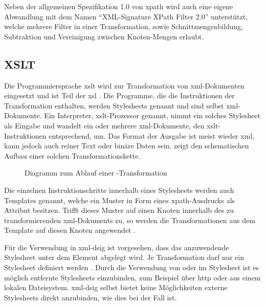 Neben der allgemeinen Spezifikation 1.0 von \gls{xpath} \cite{xpath:w3c} wird auch eine eigene Abwandlung mit dem Namen "`XML-Signature XPath Filter 2.0"'
\cite{xml-dsig-filter:w3c} unterstützt, welche mehrere Filter in einer Transformation, sowie Schnittmengenbildung, Subtraktion und Vereinigung zwischen
Knoten-Mengen erlaubt.

\subsection{XSLT}
\label{sec:XML-DSig:Transformationen:XSLT}
Die Programmiersprache \gls{xslt} wird zur Transformation von \gls{xml}-Dokumenten eingesetzt und ist Teil der \gls{xsl} \cite{xml:oreilly}. Die Programme, die
die Instruktionen der Transformation enthalten, werden Stylesheets genannt und sind selbst \gls{xml}-Dokumente. Ein Interpreter, \gls{xslt}-Prozessor genannt,
nimmt ein solches Stylesheet als Eingabe und wandelt ein oder mehrere \gls{xml}-Dokumente, den \gls{xslt}-Instruktionen entsprechend, um. Das Format der Ausgabe ist
meist wieder \gls{xml}, kann jedoch auch reiner Text oder binäre Daten sein.  zeigt den schematischen Aufbau einer solchen
Transformationskette.

\begin{figure}
    \centering
    
    \caption{Diagramm zum Ablauf einer \texorpdfstring{\protect{}}{XSLT}-Transformation}
    \label{fig:xslt-processing}
\end{figure}

Die einzelnen Instruktionschritte innerhalb eines Stylesheets werden auch Templates genannt, welche ein Muster in Form eines \gls{xpath}-Ausdrucks als Attribut besitzen. 
Trifft dieses Muster auf einen Knoten innerhalb des zu transformierenden \gls{xml}-Dokuments zu, so werden die Transformationen  aus dem Template auf diesen Knoten 
angewendet \cite{xslt:w3c,xml:oreilly}.

Für die Verwendung in \gls{xml-dsig} ist vorgesehen, dass das anzuwendende Stylesheet unter dem Element  abgelegt wird.
Je Transformation darf nur ein Stylesheet definiert werden \cite{xml-dsig:w3c}. Durch die Verwendung von  oder  im
Stylesheet ist es möglich entfernte Stylesheets einzubinden, zum Beispiel über \gls{http} oder aus einem lokalen Dateisystem. \gls{xml-dsig} selbst bietet keine
Möglichkeiten externe Stylesheets direkt anzubinden, wie dies bei  der Fall ist. 


